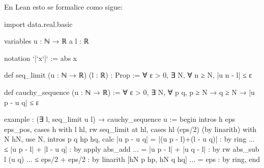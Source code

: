 En Lean esto se formalice como sigue:
\begin{leancode}
import data.real.basic

variables {u : ℕ → ℝ} {a l : ℝ}

notation `|`x`|` := abs x

def seq_limit (u : ℕ → ℝ) (l : ℝ) : Prop :=
∀ ε > 0, ∃ N, ∀ n ≥ N, |u n - l| ≤ ε

def cauchy_sequence (u : ℕ → ℝ) :=
∀ ε > 0, ∃ N, ∀ p q, p ≥ N → q ≥ N → |u p - u q| ≤ ε

example : (∃ l, seq_limit u l) → cauchy_sequence u :=
begin
intros h eps eps_pos,
cases h with l hl,
rw seq_limit at hl,
cases hl (eps/2) (by linarith) with N hN,
use N,
  intros p q hp hq,
calc  |u p - u q|
    = |(u p - l)+(l - u q)|  : by ring
... ≤ |u p - l| + |l - u q|  : by apply abs_add
... = |u p - l| + |u q - l|  : by rw abs_sub l (u q)
... ≤ eps/2 + eps/2          : by linarith [hN p hp, hN q hq]
... = eps                    : by ring,
end
\end{leancode}

